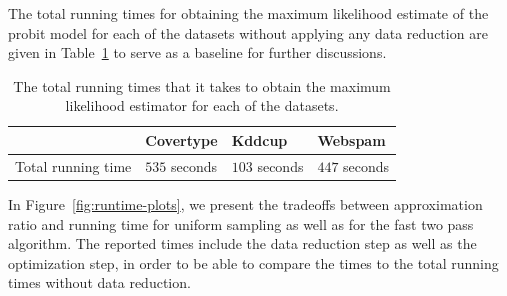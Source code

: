 The total running times for obtaining the maximum
likelihood estimate of the probit model for each of the
datasets without applying any data reduction are given in
Table~\ref{tab:running-times} to serve as a
baseline for further discussions.

\begin{table}[ht!]
    \centering
    \begin{tabular}{ l | l| l| l}
        \hline
                           & \textbf{Covertype} & \textbf{Kddcup} & \textbf{Webspam} \\ \hline
        Total running time & $535$ seconds      & $103$ seconds   & $447$ seconds    \\ \hline
    \end{tabular}
    \caption{The total running times that it takes to obtain the maximum
        likelihood estimator for each of the datasets.}
    \label{tab:running-times}
\end{table}

In Figure~\ref{fig:runtime-plots}, we present the
tradeoffs between approximation ratio and running time
for uniform sampling as well as for the fast two pass algorithm.
The reported times include the data reduction step as
well as the optimization step, in order to be able to
compare the times to the total running times without data reduction.

